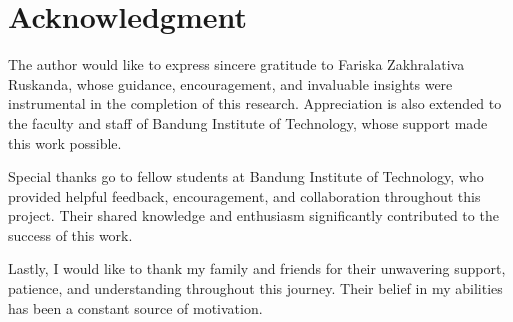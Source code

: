 \section*{Acknowledgment}

The author would like to express sincere gratitude to Fariska Zakhralativa Ruskanda, whose guidance, encouragement, and invaluable insights were instrumental in the completion of this research. Appreciation is also extended to the faculty and staff of Bandung Institute of Technology, whose support made this work possible.

Special thanks go to fellow students at Bandung Institute of Technology, who provided helpful feedback, encouragement, and collaboration throughout this project. Their shared knowledge and enthusiasm significantly contributed to the success of this work.

Lastly, I would like to thank my family and friends for their unwavering support, patience, and understanding throughout this journey. Their belief in my abilities has been a constant source of motivation.
